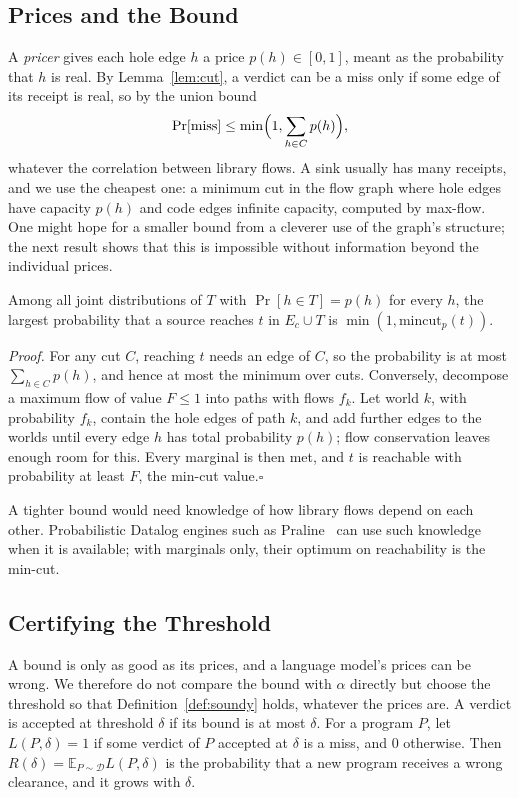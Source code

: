 \subsection{Prices and the Bound}
A \emph{pricer} gives each hole edge $h$ a price $p(h)\in[0,1]$, meant as the probability that $h$ is real.
By Lemma~\ref{lem:cut}, a verdict can be a miss only if some edge of its receipt is real, so by the union bound
\[\Pr[\text{miss}]\le\min\Bigl(1,\sum_{h\in C}p(h)\Bigr),\]
whatever the correlation between library flows.
A sink usually has many receipts, and we use the cheapest one: a minimum cut in the flow graph where hole edges have capacity $p(h)$ and code edges infinite capacity, computed by max-flow.
One might hope for a smaller bound from a cleverer use of the graph's structure; the next result shows that this is impossible without information beyond the individual prices.
\begin{proposition}[Tightness]\label{prop:tight}
Among all joint distributions of $T$ with $\Pr[h\in T]=p(h)$ for every $h$, the largest probability that a source reaches $t$ in $E_c\cup T$ is $\min(1,\mathrm{mincut}_p(t))$.
\end{proposition}
\noindent\emph{Proof.}
For any cut $C$, reaching $t$ needs an edge of $C$, so the probability is at most $\sum_{h\in C}p(h)$, and hence at most the minimum over cuts.
Conversely, decompose a maximum flow of value $F\le 1$ into paths with flows $f_k$.
Let world $k$, with probability $f_k$, contain the hole edges of path $k$, and add further edges to the worlds until every edge $h$ has total probability $p(h)$; flow conservation leaves enough room for this.
Every marginal is then met, and $t$ is reachable with probability at least $F$, the min-cut value.\hfill$\square$

\noindent A tighter bound would need knowledge of how library flows depend on each other.
Probabilistic Datalog engines such as Praline~\cite{praline} can use such knowledge when it is available; with marginals only, their optimum on reachability is the min-cut.

\subsection{Certifying the Threshold}
A bound is only as good as its prices, and a language model's prices can be wrong.
We therefore do not compare the bound with $\alpha$ directly but choose the threshold so that Definition~\ref{def:soundy} holds, whatever the prices are.
A verdict is accepted at threshold $\delta$ if its bound is at most $\delta$.
For a program $P$, let $L(P,\delta)=1$ if some verdict of $P$ accepted at $\delta$ is a miss, and $0$ otherwise.
Then $R(\delta)=\mathbb{E}_{P\sim\mathcal{D}}L(P,\delta)$ is the probability that a new program receives a wrong clearance, and it grows with $\delta$.

